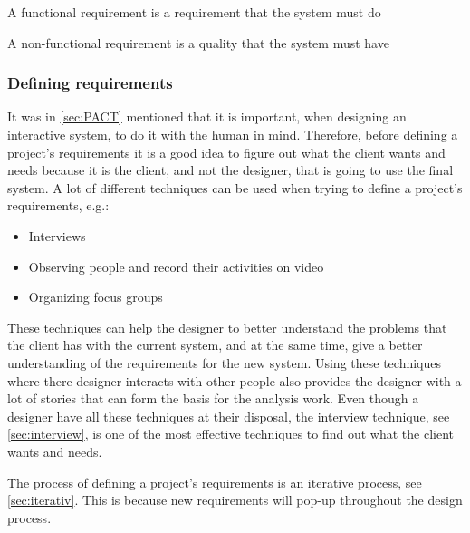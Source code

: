 \begin{defn}
    A functional requirement is a requirement that the system must do
\end{defn}

\begin{defn}
    A non-functional requirement is a quality that the system must have
\end{defn}

\subsubsection{Defining requirements} \label{sec:requirementsdefinition}
It was in \cref{sec:PACT} mentioned that it is important, when designing an interactive system, to do it with the human in mind.
Therefore, before defining a project's requirements it is a good idea to figure out what the client wants and needs because it is the client, and not the designer, that is going to use the final system.
A lot of different techniques can be used when trying to define a project's requirements, e.g.:

\begin{itemize}
    \item Interviews
    \item Observing people and record their activities on video
    \item Organizing focus groups
\end{itemize}

These techniques can help the designer to better understand the problems that the client has with the current system, and at the same time, give a better understanding of the requirements for the new system.
Using these techniques where there designer interacts with other people also provides the designer with a lot of stories that can form the basis for the analysis work. Even though a designer have all these techniques at their disposal, the interview technique, see \cref{sec:interview}, is one of the most effective techniques to find out what the client wants and needs.

The process of defining a project's requirements is an iterative process, see \cref{sec:iterativ}. This is because new requirements will pop-up throughout the design process.

